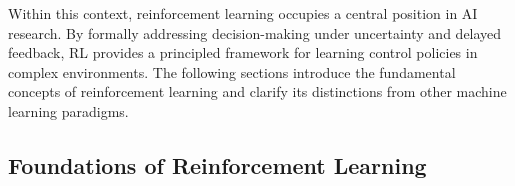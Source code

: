 Within this context, reinforcement learning occupies a central position in AI research. By formally addressing decision-making under uncertainty and delayed feedback, RL provides a principled framework for learning control policies in complex environments. The following sections introduce the fundamental concepts of reinforcement learning and clarify its distinctions from other machine learning paradigms.











\subsection{Foundations of Reinforcement Learning}

